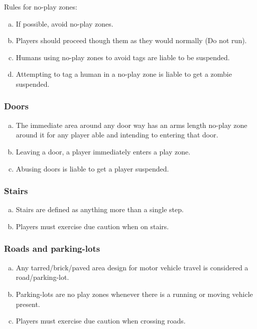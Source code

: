 \documentclass[a4paper,12pt]{article}
\begin{document}
Rules for no-play zones:
\begin{enumerate}[(a)]
    \item If possible, avoid no-play zones.
    \item Players should proceed though them as they would normally (Do not run).
    \item Humans using no-play zones to avoid tags are liable to be suspended.     
    \item Attempting to tag a human in a no-play zone is liable to get a zombie suspended.
\end{enumerate}

\subsubsection{Doors}
\begin{enumerate}[(a)]
    \item The immediate area around any door way has an arms length no-play zone around it for any player able and intending to entering that door. 
    \item Leaving a door, a player immediately enters a play zone.
    \item Abusing doors is liable to get a player suspended.
\end{enumerate}

\subsubsection{Stairs}
\begin{enumerate}[(a)]
    \item Stairs are defined as anything more than a single step.
    \item Players must exercise due caution when on stairs.
\end{enumerate}

\subsubsection{Roads and parking-lots}
\begin{enumerate}[(a)]
    \item Any tarred/brick/paved area design for motor vehicle travel is considered a road/parking-lot.
    \item Parking-lots are no play zones whenever there is a running or moving vehicle present.
    \item Players must exercise due caution when crossing roads.
\end{enumerate}
\end{document}
